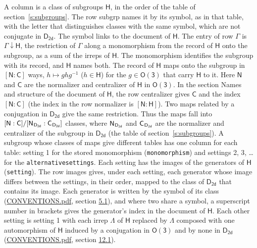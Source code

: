 \documentclass[10pt,a4paper]{article}
\numberwithin{equation}{section}
\newcommand{\grp}[1]{\mathsf{#1}}
\newcommand{\grpindex}[2]{[#1 : #2]}
\newcommand{\restr}[2]{#1\!\downarrow#2}
\newcommand{\hairsp}{\mkern1mu}
\begin{document}
A column is a class of subgroups $\grp{H}$, in the order of the table of section~\ref{s:subgroups}. The row subgrp names it by its symbol, as in that table, with the letter that distinguishes classes with the same symbol, which are not conjugate in $\grp{D_{2d}}$. The symbol links to the document of $\grp{H}$. The entry of row $\Gamma$ is $\restr{\Gamma}{\grp{H}}$, the restriction of $\Gamma$ along a monomorphism from the record of $\grp{H}$ onto the subgroup, as a sum of the irreps of $\grp{H}$. The monomorphism identifies the subgroup with its record, and $\grp{H}$ names both. \label{n:group.normalizer.o3}\label{n:group.centralizer.o3}The record of $\grp{H}$ maps onto the subgroup in $\grpindex{\grp{N}}{\grp{C}}$ ways, $h \mapsto g h g^{-1}$ ($h \in \grp{H}$) for the $g \in \grp{O(3)}$ that carry $\grp{H}$ to it. Here $\grp{N}$ and $\grp{C}$ are the normalizer and centralizer of $\grp{H}$ in \href{O3.pdf}{$\grp{O(3)}$}. In the section Names and structure of the document of $\grp{H}$, the row centralizer gives $\grp{C}$ and the index $\grpindex{\grp{N}}{\grp{C}}$ (the index in the row normalizer is $\grpindex{\grp{N}}{\grp{H}}$). Two maps related by a conjugation in $\grp{D_{2d}}$ give the same restriction. Thus the maps fall into $\grpindex{\grp{N}}{\grp{C}}/\grpindex{\grp{N}_{\hairsp \grp{D_{2d}}}}{\grp{C}_{\hairsp \grp{D_{2d}}}}$ classes, where $\grp{N}_{\hairsp \grp{D_{2d}}}$ and $\grp{C}_{\hairsp \grp{D_{2d}}}$ are the normalizer and centralizer of the subgroup in $\grp{D_{2d}}$ (the table of section~\ref{s:subgroups}). \label{n:head.setting}A subgroup whose classes of maps give different tables has one column for each table: setting 1 for the stored monomorphism (\texttt{monomorphism}) and settings 2, 3, \dots{} for the \texttt{alternativesettings}. Each setting has the images of the generators of $\grp{H}$ (\texttt{setting}). \label{n:head.images}The row images gives, under each setting, each generator whose image differs between the settings, in their order, mapped to the class of $\grp{D_{2d}}$ that contains its image. \label{n:element.generator.index}Each generator is written by the symbol of its class (\href{../../CONVENTIONS.pdf}{CONVENTIONS.pdf}, section \href{../../CONVENTIONS.pdf\#conv.5.1}{5.1}), and where two share a symbol, a superscript number in brackets gives the generator's index in the document of $\grp{H}$. \label{n:irrep.Delta}Each other setting is setting 1 with each irrep $\Lambda$ of $\grp{H}$ replaced by $\Lambda$ composed with one automorphism of $\grp{H}$ induced by a conjugation in \href{O3.pdf}{$\grp{O(3)}$} and by none in $\grp{D_{2d}}$ (\href{../../CONVENTIONS.pdf}{CONVENTIONS.pdf}, section \href{../../CONVENTIONS.pdf\#conv.12.1}{12.1}).
\end{document}
